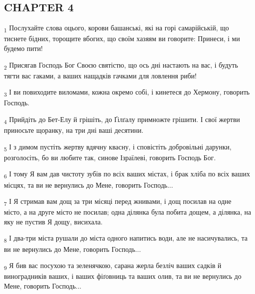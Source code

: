 \subsection{CHAPTER 4}
\begin{tcolorbox}
\textsubscript{1} Послухайте слова оцього, корови башанські, які на горі самарійській, що тиснете бідних, торощите вбогих, що своїм хазяям ви говорите: Принеси, і ми будемо пити!
\end{tcolorbox}
\begin{tcolorbox}
\textsubscript{2} Присягав Господь Бог Своєю святістю, що ось дні настають на вас, і будуть тягти вас гаками, а ваших нащадків гачками для ловлення риби!
\end{tcolorbox}
\begin{tcolorbox}
\textsubscript{3} І ви повиходите виломами, кожна окремо собі, і кинетеся до Хермону, говорить Господь.
\end{tcolorbox}
\begin{tcolorbox}
\textsubscript{4} Прийдіть до Бет-Елу й грішіть, до Ґілґалу примножте грішити. І свої жертви приносьте щоранку, на три дні ваші десятини.
\end{tcolorbox}
\begin{tcolorbox}
\textsubscript{5} І з димом пустіть жертву вдячну квасну, і сповістіть добровільні дарунки, розголосіть, бо ви любите так, синове Ізраїлеві, говорить Господь Бог.
\end{tcolorbox}
\begin{tcolorbox}
\textsubscript{6} І тому Я вам дав чистоту зубів по всіх ваших містах, і брак хліба по всіх ваших місцях, та ви не вернулись до Мене, говорить Господь...
\end{tcolorbox}
\begin{tcolorbox}
\textsubscript{7} І Я стримав вам дощ за три місяці перед жнивами, і дощ посилав на одне місто, а на друге місто не посилав; одна ділянка була побита дощем, а ділянка, на яку не пустив Я дощу, висихала.
\end{tcolorbox}
\begin{tcolorbox}
\textsubscript{8} І два-три міста рушали до міста одного напитись води, але не насичувались, та ви не вернулись до Мене, говорить Господь...
\end{tcolorbox}
\begin{tcolorbox}
\textsubscript{9} Я бив вас посухою та зеленячкою, сарана жерла безліч ваших садків й виноградників ваших, і ваших фіґовниць та ваших олив, та ви не вернулись до Мене, говорить Господь...
\end{tcolorbox}
